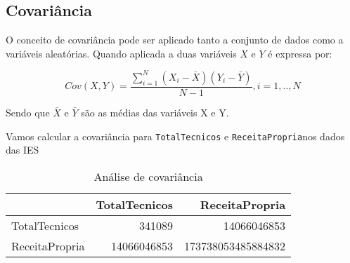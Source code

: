 \documentclass[12pt,]{style/krantz}
\makeatletter
\newenvironment{Shaded}{\begin{snugshade}}{\end{snugshade}}
\newcommand{\KeywordTok}[1]{\textcolor[rgb]{0.13,0.29,0.53}{\textbf{#1}}}
\newcommand{\DataTypeTok}[1]{\textcolor[rgb]{0.13,0.29,0.53}{#1}}
\newcommand{\StringTok}[1]{\textcolor[rgb]{0.31,0.60,0.02}{#1}}
\newcommand{\OtherTok}[1]{\textcolor[rgb]{0.56,0.35,0.01}{#1}}
\newcommand{\OperatorTok}[1]{\textcolor[rgb]{0.81,0.36,0.00}{\textbf{#1}}}
\newcommand{\NormalTok}[1]{#1}
\newenvironment{kframe}{%
\medskip{}
\setlength{\fboxsep}{.8em}
 \def\at@end@of@kframe{}%
 \ifinner\ifhmode%
  \def\at@end@of@kframe{\end{minipage}}%
  \begin{minipage}{\columnwidth}%
 \fi\fi%
 \def\FrameCommand##1{\hskip\@totalleftmargin \hskip-\fboxsep
 \colorbox{shadecolor}{##1}\hskip-\fboxsep
     \hskip-\linewidth \hskip-\@totalleftmargin \hskip\columnwidth}%
 \MakeFramed {\advance\hsize-\width
   \@totalleftmargin\z@ \linewidth\hsize
   \@setminipage}}%
 {\par\unskip\endMakeFramed%
 \at@end@of@kframe}
\renewenvironment{Shaded}{\begin{kframe}}{\end{kframe}}
\theoremstyle{definition}
\theoremstyle{definition}
\theoremstyle{definition}
\theoremstyle{remark}
\let\BeginKnitrBlock\begin \let\EndKnitrBlock\end
\makeatother
\begin{document}
\subsection{Covariância}\label{covariancia}

O conceito de covariância pode ser aplicado tanto a conjunto de dados
como a variáveis aleatórias. Quando aplicada a duas variáveis \(X\) e
\(Y\) é expressa por:

\[Cov(X,Y) = \frac {\sum_{i=1}^N(X_i-\bar X)(Y_i - \bar Y)}{N-1}, i=1,..,N\]

Sendo que \(\bar X\) e \(\bar Y\) são as médias das variáveis X e Y.

\BeginKnitrBlock{example}
\protect\hypertarget{exm:unnamed-chunk-88}{}{\label{exm:unnamed-chunk-88}
}Vamos calcular a covariância para \texttt{TotalTecnicos} e
\texttt{ReceitaPropria}nos dados das IES
\EndKnitrBlock{example}

\begin{Shaded}
\end{Shaded}

\begin{table}[!h]

\caption{\label{tab:unnamed-chunk-89}Análise de covariância}
\centering
\begin{tabular}{lrr}
\toprule
  & TotalTecnicos & ReceitaPropria\\
\midrule
TotalTecnicos & 341089 & 14066046853\\
ReceitaPropria & 14066046853 & 173738053485884832\\
\bottomrule
\end{tabular}
\end{table}
\end{document}
